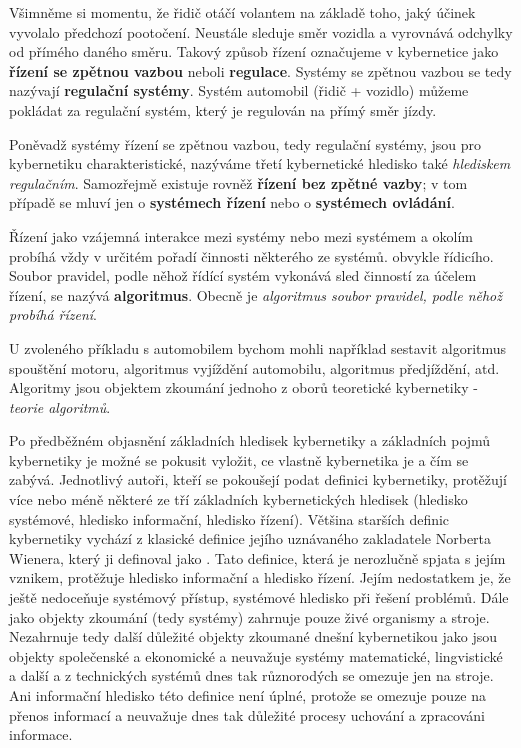       Všimněme si momentu, že řidič otáčí volantem na základě toho, jaký účinek vyvolalo předchozí 
      pootočení. Neustále sleduje směr vozidla a vyrovnává odchylky od přímého daného směru. Takový 
      způsob řízení označujeme v kybernetice jako \textbf{řízení se zpětnou vazbou} neboli 
      \textbf{regulace}. Systémy se zpětnou vazbou se tedy nazývají \textbf{regulační systémy}. 
      Systém automobil (řidič + vozidlo) můžeme pokládat za regulační systém, který je regulován na 
      přímý směr jízdy.
      
      Poněvadž systémy řízení se zpětnou vazbou, tedy regulační systémy, jsou pro kybernetiku 
      charakteristické, nazýváme třetí kybernetické hledisko také \emph{hlediskem regulačním}. 
      Samozřejmě existuje rovněž \textbf{řízení bez zpětné vazby}; v tom případě se mluví jen o 
      \textbf{systémech řízení} nebo o \textbf{systémech ovládání}.
      
      Řízení jako vzájemná interakce mezi systémy nebo mezi systémem a okolím probíhá vždy v 
      určitém pořadí činnosti některého ze systémů. obvykle řídicího. Soubor pravidel, podle něhož 
      řídící systém vykonává sled činností za účelem řízení, se nazývá \textbf{algoritmus}. Obecně 
      je \emph{algoritmus soubor pravidel, podle něhož probíhá řízení}.
      
      U zvoleného příkladu s automobilem bychom mohli například sestavit algoritmus spouštění 
      motoru, algoritmus vyjíždění automobilu, algoritmus předjíždění, atd. Algoritmy jsou objektem 
      zkoumání jednoho z oborů teoretické kybernetiky - \emph{teorie algoritmů}.
      
      Po předběžném objasnění základních hledisek kybernetiky a základních pojmů kybernetiky je 
      možné se pokusit vyložit, ce vlastně kybernetika je a čím se zabývá. Jednotlivý autoři, kteří 
      se pokoušejí podat definici kybernetiky, protěžují více nebo méně některé ze tří základních 
      kybernetických hledisek (hledisko systémové, hledisko informační, hledisko řízení). Většina 
      starších definic kybernetiky vychází z klasické definice jejího uznávaného zakladatele 
      Norberta Wienera, který ji definoval jako . Tato definice, která je nerozlučně spjata s jejím vznikem, protěžuje hledisko 
      informační a hledisko řízení. Jejím nedostatkem je, že ještě nedoceňuje systémový přístup, 
      systémové hledisko při řešení problémů. Dále jako objekty zkoumání (tedy systémy) zahrnuje 
      pouze živé organismy a stroje. Nezahrnuje tedy další důležité objekty zkoumané dnešní 
      kybernetikou jako jsou objekty společenské a ekonomické a neuvažuje systémy matematické, 
      lingvistické a další a z technických systémů dnes tak různorodých se omezuje jen na stroje. 
      Ani informační hledisko této definice není úplné, protože se omezuje pouze na přenos 
      informací a neuvažuje dnes tak důležité procesy uchování a zpracováni informace.
      
